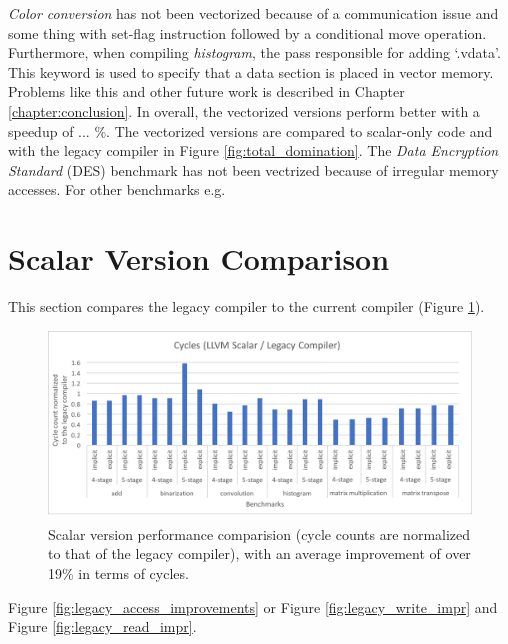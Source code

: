 \emph{Color conversion} has not been vectorized because of a communication issue and some thing with set-flag instruction followed by a conditional move operation. Furthermore, when compiling \emph{histogram}, the pass responsible for adding `.vdata'. This keyword is used to specify that a data section is placed in vector memory. Problems like this and other future work is described in Chapter \ref{chapter:conclusion}. In overall, the vectorized versions perform better with a speedup of ... \%. The vectorized versions are compared to scalar-only code and with the legacy compiler in Figure \ref{fig:total_domination}. The \emph{Data Encryption Standard} (DES) benchmark has not been vectrized because of irregular memory accesses. For other benchmarks e.g.  

\section{Scalar Version Comparison}
This section compares the legacy compiler to the current compiler (Figure \ref{fig:legacy_scalar_cmp}).  

\begin{figure}[H]
\centering
\hspace*{-.12in}
\includegraphics[width=\textwidth]{figures/compiler_cmp}
\caption{Scalar version performance comparision (cycle counts are normalized to that of the legacy compiler), with an average improvement of over 19\% in terms of cycles.}
\label{fig:legacy_scalar_cmp}
\end{figure}

Figure \ref{fig:legacy_access_improvements} or Figure \ref{fig:legacy_write_impr} and Figure \ref{fig:legacy_read_impr}.

\newpage


